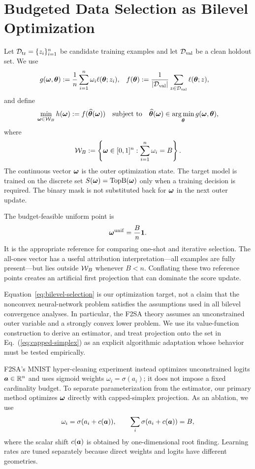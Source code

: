 \section{Budgeted Data Selection as Bilevel Optimization}
\label{sec:formulation}

Let $\mathcal{D}_{\mathrm{tr}}=\{z_i\}_{i=1}^{n}$ be candidate training examples and let
$\mathcal{D}_{\mathrm{val}}$ be a clean holdout set. We use
\begin{align}
g({\bm{\omega}},{\bm{\theta}})
    &:= \frac{1}{n}\sum_{i=1}^{n}\omega_i\ell({\bm{\theta}};z_i),
    &
f({\bm{\theta}})
    &:= \frac{1}{|\mathcal{D}_{\mathrm{val}}|}\sum_{z\in\mathcal{D}_{\mathrm{val}}}\ell({\bm{\theta}};z),
\label{eq:fg}
\end{align}
and define
\begin{equation}
\min_{{\bm{\omega}}\in\mathcal{W}_{B}} h({\bm{\omega}})
    := f(\widehat{{\bm{\theta}}}({\bm{\omega}}))
\quad\text{subject to}\quad
\widehat{{\bm{\theta}}}({\bm{\omega}})\in
    \operatorname*{arg\,min}_{{\bm{\theta}}}g({\bm{\omega}},{\bm{\theta}}),
\label{eq:bilevel-selection}
\end{equation}
where
\begin{equation}
\mathcal{W}_{B}:=\left\{{\bm{\omega}}\in[0,1]^n:
\sum_{i=1}^{n}\omega_i=B\right\}.
\label{eq:capped-simplex}
\end{equation}
The continuous vector ${\bm{\omega}}$ is the outer optimization state. The target
model is trained on the discrete set
$S({\bm{\omega}})=\operatorname{TopB}({\bm{\omega}})$ only when a training decision is
required. The binary mask is not substituted back for ${\bm{\omega}}$ in the next
outer update.

The budget-feasible uniform point is
\begin{equation}
{\bm{\omega}}^{\mathrm{unif}}=\frac{B}{n}\bm{1}.
\label{eq:uniform-budget}
\end{equation}
It is the appropriate reference for comparing one-shot and iterative
selection. The all-ones vector has a useful attribution interpretation---all
examples are fully present---but lies outside $\mathcal{W}_{B}$ whenever $B<n$.
Conflating these two reference points creates an artificial first projection
that can dominate the score update.

Equation~\ref{eq:bilevel-selection} is our optimization target, not a claim
that the nonconvex neural-network problem satisfies the assumptions used in
all bilevel convergence analyses. In particular, the F2SA theory assumes an
unconstrained outer variable and a strongly convex lower problem. We use its
value-function construction to derive an estimator, and treat projection onto
the set in Eq.~(\ref{eq:capped-simplex}) as an explicit algorithmic adaptation whose behavior
must be tested empirically.

F2SA's MNIST hyper-cleaning experiment instead optimizes unconstrained logits
${\bm{a}}\in\mathbb{R}^n$ and uses sigmoid weights $\omega_i=\sigma(a_i)$; it does
not impose a fixed cardinality budget. To separate parameterization from the
estimator, our primary method optimizes ${\bm{\omega}}$ directly with capped-simplex
projection. As an ablation, we use
\begin{equation}
\omega_i=\sigma(a_i+c({\bm{a}})),
\qquad \sum_i\sigma(a_i+c({\bm{a}}))=B,
\end{equation}
where the scalar shift $c({\bm{a}})$ is obtained by one-dimensional root finding.
Learning rates are tuned separately because direct weights and logits have
different geometries.
